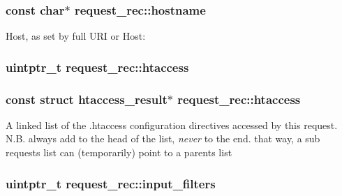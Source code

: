 \subsubsection[{\texorpdfstring{hostname}{hostname}}]{\setlength{\rightskip}{0pt plus 5cm}const char$\ast$ request\+\_\+rec\+::hostname}\hypertarget{structrequest__rec_a5967124e27a5a9c0cb708aea5df1ab93}{}\label{structrequest__rec_a5967124e27a5a9c0cb708aea5df1ab93}
Host, as set by full U\+RI or Host\+: 
\subsubsection[{\texorpdfstring{htaccess}{htaccess}}]{\setlength{\rightskip}{0pt plus 5cm}uintptr\+\_\+t request\+\_\+rec\+::htaccess}\hypertarget{structrequest__rec_a9d2dc4bbe8bb71486e68f8a706297eb1}{}\label{structrequest__rec_a9d2dc4bbe8bb71486e68f8a706297eb1}
\subsubsection[{\texorpdfstring{htaccess}{htaccess}}]{\setlength{\rightskip}{0pt plus 5cm}const struct {\bf htaccess\+\_\+result}$\ast$ request\+\_\+rec\+::htaccess}\hypertarget{structrequest__rec_a59801b64e506082b8e163adcdd7644b0}{}\label{structrequest__rec_a59801b64e506082b8e163adcdd7644b0}
A linked list of the .htaccess configuration directives accessed by this request. N.\+B. always add to the head of the list, {\itshape never} to the end. that way, a sub request\textquotesingle{}s list can (temporarily) point to a parent\textquotesingle{}s list 
\subsubsection[{\texorpdfstring{input\+\_\+filters}{input_filters}}]{\setlength{\rightskip}{0pt plus 5cm}uintptr\+\_\+t request\+\_\+rec\+::input\+\_\+filters}\hypertarget{structrequest__rec_ab07868ed8240b6236a51aa1e7b198d3e}{}\label{structrequest__rec_ab07868ed8240b6236a51aa1e7b198d3e}
